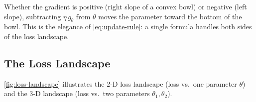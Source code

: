 \documentclass[12pt,a4paper]{article}
\begin{document}
\begin{keyinsight}[title=The update rule always moves downhill]
Whether the gradient is positive (right slope of a convex bowl) or
negative (left slope), subtracting $\eta\,g_\theta$ from $\theta$ moves the
parameter toward the bottom of the bowl.
This is the elegance of \cref{eq:update-rule}: a single formula handles
both sides of the loss landscape.
\end{keyinsight}

\subsection{The Loss Landscape}

\cref{fig:loss-landscape} illustrates the 2-D loss landscape (loss vs.\
one parameter $\theta$) and the 3-D landscape (loss vs.\ two parameters
$\theta_1, \theta_2$).
\end{document}
